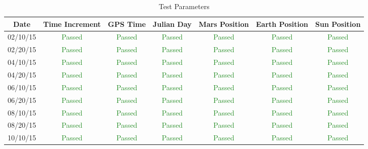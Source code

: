 \begin{table}[htbp]
    \caption{Test Parameters}
   \label{tab:parameters}
        \centering \fontsize{10}{10}\selectfont
   \begin{tabular}{c | c | c | c | c | c | c} %
      \hline
      Date   & Time Increment &GPS Time& Julian Day & Mars Position & Earth Position & Sun Position \\
      \hline
      02/10/15 & \textcolor{ForestGreen}{Passed} & \textcolor{ForestGreen}{Passed} &  \textcolor{ForestGreen}{Passed}&  \textcolor{ForestGreen}{Passed} & \textcolor{ForestGreen}{Passed} &  \textcolor{ForestGreen}{Passed}\\
      02/20/15 & \textcolor{ForestGreen}{Passed} & \textcolor{ForestGreen}{Passed} &  \textcolor{ForestGreen}{Passed}&  \textcolor{ForestGreen}{Passed} & \textcolor{ForestGreen}{Passed} &  \textcolor{ForestGreen}{Passed}\\
      04/10/15 & \textcolor{ForestGreen}{Passed} & \textcolor{ForestGreen}{Passed} &  \textcolor{ForestGreen}{Passed}&  \textcolor{ForestGreen}{Passed} & \textcolor{ForestGreen}{Passed} &  \textcolor{ForestGreen}{Passed}\\
      04/20/15 & \textcolor{ForestGreen}{Passed} & \textcolor{ForestGreen}{Passed} &  \textcolor{ForestGreen}{Passed}&  \textcolor{ForestGreen}{Passed} & \textcolor{ForestGreen}{Passed} &  \textcolor{ForestGreen}{Passed}\\
      06/10/15 & \textcolor{ForestGreen}{Passed} & \textcolor{ForestGreen}{Passed} &  \textcolor{ForestGreen}{Passed}&  \textcolor{ForestGreen}{Passed} & \textcolor{ForestGreen}{Passed} &  \textcolor{ForestGreen}{Passed}\\
      06/20/15 & \textcolor{ForestGreen}{Passed} & \textcolor{ForestGreen}{Passed} &  \textcolor{ForestGreen}{Passed}&  \textcolor{ForestGreen}{Passed} & \textcolor{ForestGreen}{Passed} &  \textcolor{ForestGreen}{Passed}\\
      08/10/15 & \textcolor{ForestGreen}{Passed} & \textcolor{ForestGreen}{Passed} &  \textcolor{ForestGreen}{Passed}&  \textcolor{ForestGreen}{Passed} & \textcolor{ForestGreen}{Passed} &  \textcolor{ForestGreen}{Passed}\\
      08/20/15 & \textcolor{ForestGreen}{Passed} & \textcolor{ForestGreen}{Passed} &  \textcolor{ForestGreen}{Passed}&  \textcolor{ForestGreen}{Passed} & \textcolor{ForestGreen}{Passed} &  \textcolor{ForestGreen}{Passed}\\
      10/10/15 & \textcolor{ForestGreen}{Passed} & \textcolor{ForestGreen}{Passed} &  \textcolor{ForestGreen}{Passed}&  \textcolor{ForestGreen}{Passed} & \textcolor{ForestGreen}{Passed} &  \textcolor{ForestGreen}{Passed}\\

\end{tabular}
\end{table}
